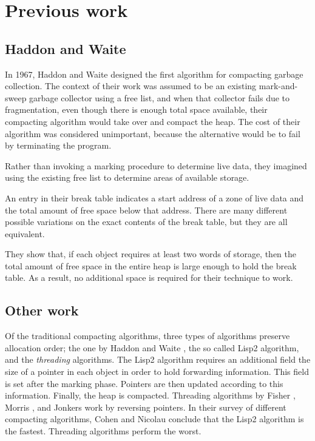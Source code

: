 \section{Previous work}

\subsection{Haddon and Waite}

In 1967, Haddon and Waite \cite{Haddon:1967} designed the first
algorithm for compacting garbage collection.  The context of their
work was assumed to be an existing mark-and-sweep garbage collector
using a free list, and when that collector fails due to fragmentation,
even though there is enough total space available, their compacting
algorithm would take over and compact the heap.  The cost of their
algorithm was considered unimportant, because the alternative would be
to fail by terminating the program.

Rather than invoking a marking procedure to determine live data, they
imagined using the existing free list to determine areas of available
storage. 

An entry in their break table indicates a start address of a zone of
live data and the total amount of free space below that address.
There are many different possible variations on the exact contents of
the break table, but they are all equivalent.

They show that, if each object requires at least two words of storage,
then the total amount of free space in the entire heap is large enough
to hold the break table.  As a result, no additional space is
required for their technique to work.

\subsection{Other work}

Of the traditional compacting algorithms, three types of algorithms
preserve allocation order; the one by Haddon and Waite
\cite{Haddon:1967}, the so called Lisp2 algorithm, and the
\emph{threading} algorithms.  The Lisp2 algorithm requires an
additional field the size of a pointer in each object in order to hold
forwarding information.  This field is set after the marking phase.
Pointers are then updated according to this information.  Finally, the
heap is compacted.  Threading algorithms by Fisher \cite{fish74},
Morris \cite{morr78}, and Jonkers \cite{jonk79} work by reversing
pointers.  In their survey of different compacting algorithms, Cohen
and Nicolau \cite{Cohen:1983:CCA:69575.357226} conclude that the Lisp2
algorithm is the fastest.  Threading algorithms perform the worst.

